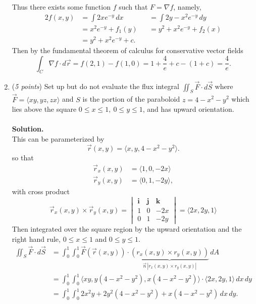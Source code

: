 \documentclass[12 pt]{article}
\begin{document}
\begin{enumerate}
		Thus there exists some function $f$ such that $F = \nabla f$, namely, \begin{alignat*}{2}
			f(x, y) &= \int 2x e^{-y} \, dx &&= \int 2y-x^2e^{-y} \, dy \\
							&= x^2e^{-y} + f_1(y)   &&= y^2 + x^2e^{-y} + f_2(x) \\
							&= y^2 + x^2e^{-y} + c.
		\end{alignat*}
		Then by the fundamental theorem of calculus for conservative vector fields
		\[
			\int_C\nabla f\cdot d\vec{r} = f(2, 1) - f(1, 0) = 1 + \frac 4e + c - (1 + c) = \frac 4e.
		\]
		\pagebreak
		\item (\textit{5 points})
				Set up but do not evaluate the flux integral
				$\iint_S \Vec{F}\cdot d\Vec{S}$ where
				$\vec{F} =\langle xy, yz ,zx \rangle $ and $S$ is the portion of the
				paraboloid $z=4-x^2-y^2$ which lies above the square
				$0\le x\le 1, \ 0\le y\le 1$, and has upward orientation.
    \\~\\
    \textbf{Solution.}\\
			This can be parameterized by \[
				\vec r(x, y) = \langle x, y, 4 - x^2 - y^2 \rangle.
			\] so that \begin{align*}
				\vec r_x(x, y) &= \langle 1, 0, -2x \rangle \\
				\vec r_y(x, y) &= \langle 0, 1, -2y \rangle,
			\end{align*} with cross product \[
				\vec r_x(x, y) \times \vec r_y(x, y)
				= \begin{vmatrix}
					\mathbf i & \mathbf j & \mathbf k \\
					1         & 0         & -2x \\
					0         & 1         & -2y
				\end{vmatrix}
				= \langle 2x, 2y, 1 \rangle
			\]
			Then integrated over the square region by the upward orientation and the
			right hand rule,
			$0 \le x \le 1$ and $0 \le y \le 1$. \begin{align*}
				\iint_S \Vec{F}\cdot d\Vec{S}
				&= \int_0^1\int_0^1 \Vec F(\vec r(x, y)) \cdot \underbrace{(r_x(x, y) \times r_y(x, y))}_{\vec n\, |r_x(x, y) \times r_y(x, y)|}\,dA \\
				&= \int_0^1\int_0^1
					\langle xy, y(4 - x^2 - y^2), x(4 - x^2 - y^2)\rangle
					\cdot \langle 2x, 2y, 1 \rangle
				\,dx\,dy \\
				&= \int_0^1\int_0^1
					2x^2y + 2y^2(4 - x^2 - y^2) + x(4 - x^2 - y^2)
				\,dx\,dy.
			\end{align*}
  \end{enumerate}
\end{document}
